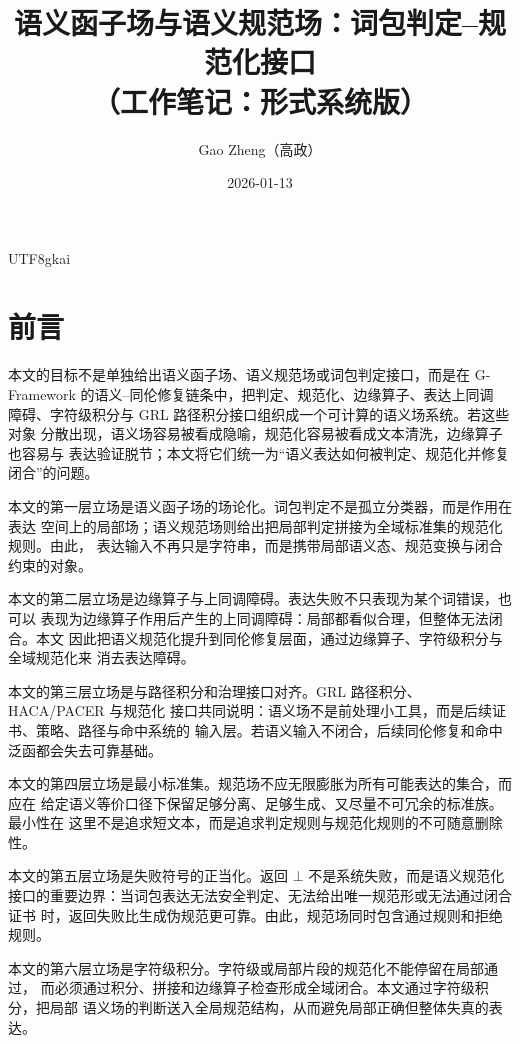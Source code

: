 \documentclass[12pt]{article}
\newcommand{\GFramework}{\textsf{G-Framework}}
\begin{document}
\begin{CJK*}{UTF8}{gkai}

\title{语义函子场与语义规范场：词包判定--规范化接口\\（工作笔记：形式系统版）}
\author{Gao Zheng（高政）}
\date{2026-01-13}
\maketitle

\section*{前言}

本文的目标不是单独给出语义函子场、语义规范场或词包判定接口，而是在
\GFramework{} 的语义--同伦修复链条中，把判定、规范化、边缘算子、表达上同调
障碍、字符级积分与 GRL 路径积分接口组织成一个可计算的语义场系统。若这些对象
分散出现，语义场容易被看成隐喻，规范化容易被看成文本清洗，边缘算子也容易与
表达验证脱节；本文将它们统一为“语义表达如何被判定、规范化并修复闭合”的问题。

本文的第一层立场是语义函子场的场论化。词包判定不是孤立分类器，而是作用在表达
空间上的局部场；语义规范场则给出把局部判定拼接为全域标准集的规范化规则。由此，
表达输入不再只是字符串，而是携带局部语义态、规范变换与闭合约束的对象。

本文的第二层立场是边缘算子与上同调障碍。表达失败不只表现为某个词错误，也可以
表现为边缘算子作用后产生的上同调障碍：局部都看似合理，但整体无法闭合。本文
因此把语义规范化提升到同伦修复层面，通过边缘算子、字符级积分与全域规范化来
消去表达障碍。

本文的第三层立场是与路径积分和治理接口对齐。GRL 路径积分、HACA/PACER 与规范化
接口共同说明：语义场不是前处理小工具，而是后续证书、策略、路径与命中系统的
输入层。若语义输入不闭合，后续同伦修复和命中泛函都会失去可靠基础。

本文的第四层立场是最小标准集。规范场不应无限膨胀为所有可能表达的集合，而应在
给定语义等价口径下保留足够分离、足够生成、又尽量不可冗余的标准族。最小性在
这里不是追求短文本，而是追求判定规则与规范化规则的不可随意删除性。

本文的第五层立场是失败符号的正当化。返回 \(\bot\) 不是系统失败，而是语义规范化
接口的重要边界：当词包表达无法安全判定、无法给出唯一规范形或无法通过闭合证书
时，返回失败比生成伪规范更可靠。由此，规范场同时包含通过规则和拒绝规则。

本文的第六层立场是字符级积分。字符级或局部片段的规范化不能停留在局部通过，
而必须通过积分、拼接和边缘算子检查形成全域闭合。本文通过字符级积分，把局部
语义场的判断送入全局规范结构，从而避免局部正确但整体失真的表达。


\end{CJK*}
\end{document}
